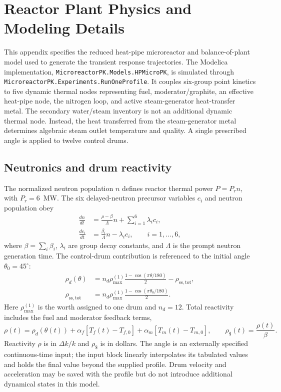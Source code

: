 \section{Reactor Plant Physics and Modeling Details}
\label{ap:plantmodel}

This appendix specifies the reduced heat-pipe microreactor and balance-of-plant model used to generate the transient response trajectories. The Modelica implementation, \texttt{MicroreactorPK.Models.HPMicroPK}, is simulated through \texttt{MicroreactorPK.Experiments.RunOneProfile}. It couples six-group point kinetics to five dynamic thermal nodes representing fuel, moderator/graphite, an effective heat-pipe node, the nitrogen loop, and active steam-generator heat-transfer metal. The secondary water/steam inventory is not an additional dynamic thermal node. Instead, the heat transferred from the steam-generator metal determines algebraic steam outlet temperature and quality. A single prescribed angle is applied to twelve control drums.

\subsection{Neutronics and drum reactivity}

The normalized neutron population $n$ defines reactor thermal power $P=P_r n$, with $P_r=6$~MW. The six delayed-neutron precursor variables $c_i$ and neutron population obey
\begin{align}
 \frac{dn}{dt}
 &=\frac{\rho-\beta}{\Lambda}n+\sum_{i=1}^{6}\lambda_i c_i,
 \label{eq:app:neutron}\\
 \frac{dc_i}{dt}
 &=\frac{\beta_i}{\Lambda}n-\lambda_i c_i,\qquad i=1,\ldots,6,
 \label{eq:app:precursor}
\end{align}
where $\beta=\sum_i\beta_i$, $\lambda_i$ are group decay constants, and $\Lambda$ is the prompt neutron generation time. The control-drum contribution is referenced to the initial angle $\theta_0=45^\circ$:
\begin{align}
 \rho_d(\theta)
 &=n_d\rho_{\max}^{(1)}
  \frac{1-\cos(\pi\theta/180)}{2}-\rho_{\mathrm{ss,tot}},
 \label{eq:app:drum}\\
 \rho_{\mathrm{ss,tot}}
 &=n_d\rho_{\max}^{(1)}
  \frac{1-\cos(\pi\theta_0/180)}{2}.
\end{align}
Here $\rho_{\max}^{(1)}$ is the worth assigned to one drum and $n_d=12$. Total reactivity includes the fuel and moderator feedback terms,
\begin{equation}
 \rho(t)=\rho_d(\theta(t))
    +\alpha_f[T_f(t)-T_{f,0}]
    +\alpha_m[T_m(t)-T_{m,0}],
 \qquad \rho_{\$}(t)=\frac{\rho(t)}{\beta}.
 \label{eq:app:reactivity}
\end{equation}
Reactivity $\rho$ is in $\Delta k/k$ and $\rho_{\$}$ is in dollars. The angle is an externally specified continuous-time input; the input block linearly interpolates its tabulated values and holds the final value beyond the supplied profile. Drum velocity and acceleration may be saved with the profile but do not introduce additional dynamical states in this model.

